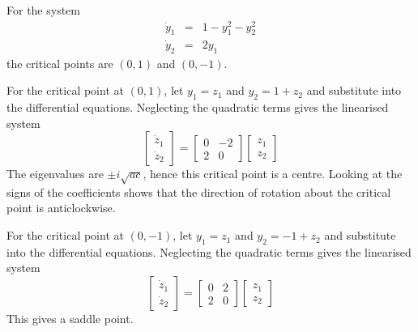 \begin{example}

For the system
\begin{eqnarray*}
\dot{y}_1&=&1-y_1^2-y_2^2\\
\dot{y}_2&=&2y_1
\end{eqnarray*}
the critical points are $(0,1)$ and $(0,-1)$.

For the critical point at $(0,1)$, let $y_1=z_1$ and $y_2=1+z_2$ and
substitute into the differential equations.  Neglecting the quadratic terms
gives the linearised system
$$\begin{bmatrix} \dot{z}_1 \\ \dot{z}_2 \end{bmatrix} = 
\begin{bmatrix} 0 & -2 \\ 2 & 0 \end{bmatrix}
\begin{bmatrix} z_1 \\ z_2 \end{bmatrix}$$
The eigenvalues are $\pm i\sqrt{ac}$, hence this critical point is a centre.
Looking at the signs of the coefficients shows that the direction of
rotation about the critical point is anticlockwise.

\begin{center}
\end{center}

For the critical point at $(0,-1)$, let $y_1=z_1$ and $y_2=-1+z_2$ and
substitute into the differential equations.  Neglecting the quadratic terms
gives the linearised system
$$\begin{bmatrix} \dot{z}_1 \\ \dot{z}_2 \end{bmatrix} = 
\begin{bmatrix} 0 & 2 \\ 2 & 0 \end{bmatrix}
\begin{bmatrix} z_1 \\ z_2 \end{bmatrix}$$
This gives a saddle point.

\begin{center}
\end{center}


\end{example}
